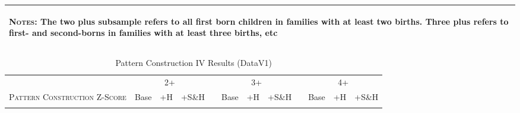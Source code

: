 \begin{landscape}
\begin{table}[htpb!]
\begin{center}
\begin{tabular}{lcccp{2mm}cccp{2mm}ccc}
\midrule\multicolumn{12}{p{19.2cm}}{\begin{footnotesize}\textsc{Notes:} The two plus subsample refers to all first born children in families with at least two births.  Three plus refers to first- and second-borns in families with at least three births, etc\end{footnotesize}} \\ \bottomrule 
\end{tabular}\end{center}\end{table}\end{landscape}\begin{landscape}\begin{table}[htpb!]\caption{Pattern Construction IV Results (DataV1)}
\label{TWINtab:IVAll}
\begin{center}\begin{tabular}{lcccp{2mm}cccp{2mm}ccc}
\toprule \toprule 
&\multicolumn{3}{c}{2+}&&\multicolumn{3}{c}{3+}&&\multicolumn{3}{c}{4+}\\ \cmidrule(r){2-4} \cmidrule(r){6-8} \cmidrule(r){10-12} 
\textsc{Pattern Construction Z-Score}&Base&+H&+S\&H&&Base&+H&+S\&H&&Base&+H&+S\&H\\ \midrule 
\begin{footnotesize}\end{footnotesize}& 
\begin{footnotesize}\end{footnotesize}& 
\begin{footnotesize}\end{footnotesize}& 
\begin{footnotesize}\end{footnotesize}& 
\begin{footnotesize}\end{footnotesize}& 
\begin{footnotesize}\end{footnotesize}& 
\begin{footnotesize}\end{footnotesize}& 
\begin{footnotesize}\end{footnotesize}& 
\begin{footnotesize}\end{footnotesize}& 
\begin{footnotesize}\end{footnotesize}& 
\begin{footnotesize}\end{footnotesize}& 

\end{tabular}
\end{center}
\end{table}
\end{landscape}
